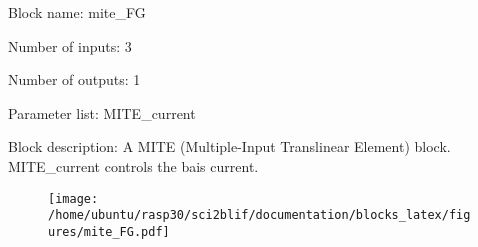 \pagebreak

Block name: mite\_FG

Number of inputs: 3

Number of outputs: 1

Parameter list: MITE\_current

Block description: 
A MITE (Multiple-Input Translinear Element) block. MITE\_current controls the bais current.

\begin{figure}[H]  %
\texttt{[image: /home/ubuntu/rasp30/sci2blif/documentation/blocks\_latex/figures/mite\_FG.pdf]}
\end{figure}

